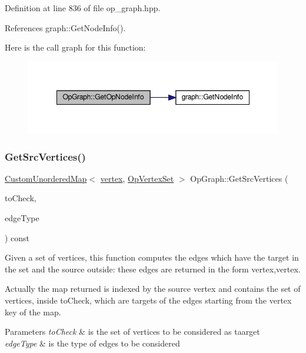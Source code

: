 Definition at line 836 of file op\+\_\+graph.\+hpp.



References graph\+::\+Get\+Node\+Info().

Here is the call graph for this function\+:
\nopagebreak
\begin{figure}[H]
\begin{center}
\leavevmode
\includegraphics[width=348pt]{d6/d79/structOpGraph_a182a5edee5fd5c4c38cf21d3651f7ec1_cgraph}
\end{center}
\end{figure}
\mbox{\label{structOpGraph_aef07453090deb05f3b216ac159043b07}} 
\subsubsection{\texorpdfstring{Get\+Src\+Vertices()}{GetSrcVertices()}}
{\footnotesize\ttfamily \hyperlink{custom__map_8hpp_ad1ed68f2ff093683ab1a33522b144adc}{Custom\+Unordered\+Map}$<$ \hyperlink{graph_8hpp_abefdcf0544e601805af44eca032cca14}{vertex}, \hyperlink{classOpVertexSet}{Op\+Vertex\+Set} $>$ Op\+Graph\+::\+Get\+Src\+Vertices (\begin{DoxyParamCaption}\item[{const \hyperlink{classOpVertexSet}{Op\+Vertex\+Set} \&}]{to\+Check,  }\item[{int}]{edge\+Type }\end{DoxyParamCaption}) const}



Given a set of vertices, this function computes the edges which have the target in the set and the source outside\+: these edges are returned in the form vertex,vertex. 

Actually the map returned is indexed by the source vertex and contains the set of vertices, inside to\+Check, which are targets of the edges starting from the vertex key of the map. 
\begin{DoxyParams}{Parameters}
{\em to\+Check} & is the set of vertices to be considered as taarget \\
\hline
{\em edge\+Type} & is the type of edges to be considered \\
\hline
\end{DoxyParams}


